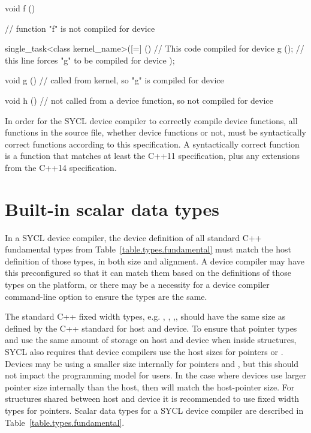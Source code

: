\begin{code}
void f ()
{
    // function "f" is not compiled for device

    single_task<class kernel_name>([=] ()
        {
            // This code compiled for device
            g (); // this line forces "g" to be compiled for device
        });
}

void g ()
{
    // called from kernel, so "g" is compiled for device
}

void h ()
{
    // not called from a device function, so not compiled for device
}
\end{code}

In order for the SYCL device compiler to correctly compile device functions, all
functions in the source file, whether device functions or not, must be
syntactically correct functions according to this specification. A syntactically
correct function is a function that matches at least the C++11 specification,
plus any extensions from the C++14 specification.

\section{Built-in scalar data types}
\label{subsection:scalartypes}
In a SYCL device compiler, the device definition of all standard C++ fundamental
types from Table~\ref{table.types.fundamental} must match the host definition of those types, in both
size and alignment. A device
compiler may have this preconfigured so that it can match them based on the
definitions of those types on the platform, or there may be a necessity for a
device compiler command-line option to ensure the types are the same.

The standard C++ fixed width types, e.g. ,
, ,,
should have the same size as defined by the C++ standard for host and
device.
\ifx\showtodos\true
To ensure that pointer types and  use the same amount of
storage on host and device when inside structures, SYCL also requires that
device compilers use the host sizes for pointers or . Devices
may be using a smaller size internally for pointers and ,
but this should not impact the programming model for users. In the case where
devices use larger pointer size internally than the host, then
 will match the \gls{host-pointer} size. For structures shared
between host and device it is recommended to use fixed width types for pointers.
Scalar data types for a SYCL device compiler are described in
Table~\ref{table.types.fundamental}.
\fi

